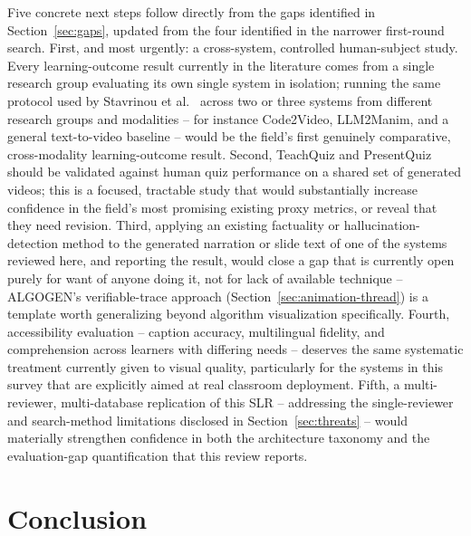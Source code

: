 \documentclass[journal]{IEEEtran}
\begin{document}
Five concrete next steps follow directly from the gaps identified in Section~\ref{sec:gaps}, updated from the four identified in the narrower first-round search. First, and most urgently: a cross-system, controlled human-subject study. Every learning-outcome result currently in the literature comes from a single research group evaluating its own single system in isolation; running the same protocol used by Stavrinou et al.\ \cite{stavrinou2025reeldeal} across two or three systems from different research groups and modalities -- for instance Code2Video, LLM2Manim, and a general text-to-video baseline -- would be the field's first genuinely comparative, cross-modality learning-outcome result. Second, TeachQuiz and PresentQuiz should be validated against human quiz performance on a shared set of generated videos; this is a focused, tractable study that would substantially increase confidence in the field's most promising existing proxy metrics, or reveal that they need revision. Third, applying an existing factuality or hallucination-detection method to the generated narration or slide text of one of the systems reviewed here, and reporting the result, would close a gap that is currently open purely for want of anyone doing it, not for lack of available technique -- ALGOGEN's verifiable-trace approach (Section~\ref{sec:animation-thread}) is a template worth generalizing beyond algorithm visualization specifically. Fourth, accessibility evaluation -- caption accuracy, multilingual fidelity, and comprehension across learners with differing needs -- deserves the same systematic treatment currently given to visual quality, particularly for the systems in this survey that are explicitly aimed at real classroom deployment. Fifth, a multi-reviewer, multi-database replication of this SLR -- addressing the single-reviewer and search-method limitations disclosed in Section~\ref{sec:threats} -- would materially strengthen confidence in both the architecture taxonomy and the evaluation-gap quantification that this review reports.

\section{Conclusion}
\label{sec:conclusion}
\end{document}
